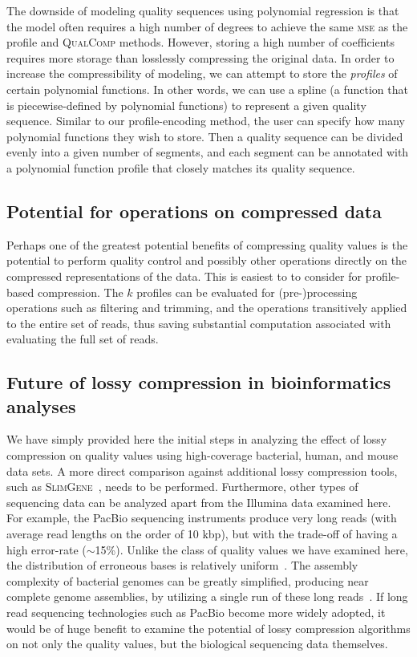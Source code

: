 \documentclass{bioinfo}
\begin{document}
The downside of modeling quality sequences using polynomial regression
is that the model often requires a high number of degrees to achieve
the same \textsc{mse} as the profile and \textsc{QualComp} methods.
However, storing a high number of coefficients requires more storage
than losslessly compressing the original data. In order to increase
the compressibility of modeling, we can attempt to store the
\emph{profiles} of certain polynomial functions. In other words, we
can use a spline (a function that is piecewise-defined by polynomial
functions) to represent a given quality sequence. Similar to our
profile-encoding method, the user can specify how many polynomial
functions they wish to store. Then a quality sequence can be divided
evenly into a given number of segments, and each segment can be
annotated with a polynomial function profile that closely matches its
quality sequence.

\subsection{Potential for operations on compressed data}

Perhaps one of the greatest potential benefits of compressing quality
values is the potential to perform quality control and possibly other
operations directly on the compressed representations of the
data. This is easiest to to consider for profile-based
compression. The $k$ profiles can be evaluated for (pre-)processing
operations such as filtering and trimming, and the operations
transitively applied to the entire set of reads, thus saving
substantial computation associated with evaluating the full set of
reads.

\subsection{Future of lossy compression in bioinformatics analyses}

We have simply provided here the initial steps in analyzing the effect
of lossy compression on quality values using high-coverage bacterial,
human, and mouse data sets. A more direct comparison against
additional lossy compression tools, such as
\textsc{SlimGene}~\citep{Kozanitis:2011kl}, needs to be
performed. Furthermore, other types of sequencing data can be analyzed
apart from the Illumina data examined here. For example, the PacBio
sequencing instruments produce very long reads (with average read
lengths on the order of 10 kbp), but with the trade-off of having a
high error-rate ($\sim$15\%). Unlike the class of quality values we
have examined here, the distribution of erroneous bases is relatively
uniform~\citep{Ferrarini:2013vf}. The assembly complexity of bacterial
genomes can be greatly simplified, producing near complete genome
assemblies, by utilizing a single run of these long
reads~\citep{Koren:2013ye}. If long read sequencing technologies such
as PacBio become more widely adopted, it would be of huge benefit to
examine the potential of lossy compression algorithms on not only the
quality values, but the biological sequencing data themselves.
\end{document}
